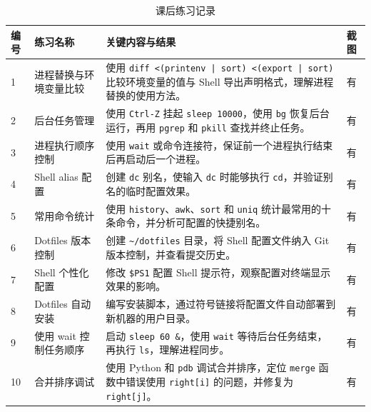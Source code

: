 \documentclass[UTF8,12pt,a4paper]{ctexart}
\begin{document}
\begin{table}[H]
    \centering
    \caption{课后练习记录}
    \label{tab:after-class}
    \begin{tabular}{p{}p{}p{}p{}}
        \toprule
        编号 & 练习名称 & 关键内容与结果 & 截图 \\
        \midrule
        1 & 进程替换与环境变量比较
        & 使用 \texttt{diff <(printenv | sort) <(export | sort)} 比较环境变量的值与 Shell 导出声明格式，理解进程替换的使用方法。
        & 有 \\

        2 & 后台任务管理
        & 使用 \texttt{Ctrl-Z} 挂起 \texttt{sleep 10000}，使用 \texttt{bg} 恢复后台运行，再用 \texttt{pgrep} 和 \texttt{pkill} 查找并终止任务。
        & 有 \\

        3 & 进程执行顺序控制
        & 使用 \texttt{wait} 或命令连接符，保证前一个进程执行结束后再启动后一个进程。
        & 有 \\

        4 & Shell alias 配置
        & 创建 \texttt{dc} 别名，使输入 \texttt{dc} 时能够执行 \texttt{cd}，并验证别名的临时配置效果。
        & 有 \\

        5 & 常用命令统计
        & 使用 \texttt{history}、\texttt{awk}、\texttt{sort} 和 \texttt{uniq} 统计最常用的十条命令，并分析可配置的快捷别名。
        & 有 \\

        6 & Dotfiles 版本控制
        & 创建 \texttt{\textasciitilde/dotfiles} 目录，将 Shell 配置文件纳入 Git 版本控制，并查看提交历史。
        & 有 \\

        7 & Shell 个性化配置
        & 修改 \texttt{\$PS1} 配置 Shell 提示符，观察配置对终端显示效果的影响。
        & 有 \\

        8 & Dotfiles 自动安装
        & 编写安装脚本，通过符号链接将配置文件自动部署到新机器的用户目录。
        & 有 \\

        9 & 使用 wait 控制任务顺序
        & 启动 \texttt{sleep 60 \&}，使用 \texttt{wait} 等待后台任务结束，再执行 \texttt{ls}，理解进程同步。
        & 有 \\

        10 & 合并排序调试
        & 使用 Python 和 \texttt{pdb} 调试合并排序，定位 \texttt{merge} 函数中错误使用 \texttt{right[i]} 的问题，并修复为 \texttt{right[j]}。
        & 有 \\
        \bottomrule
    \end{tabular}
\end{table}
\end{document}
